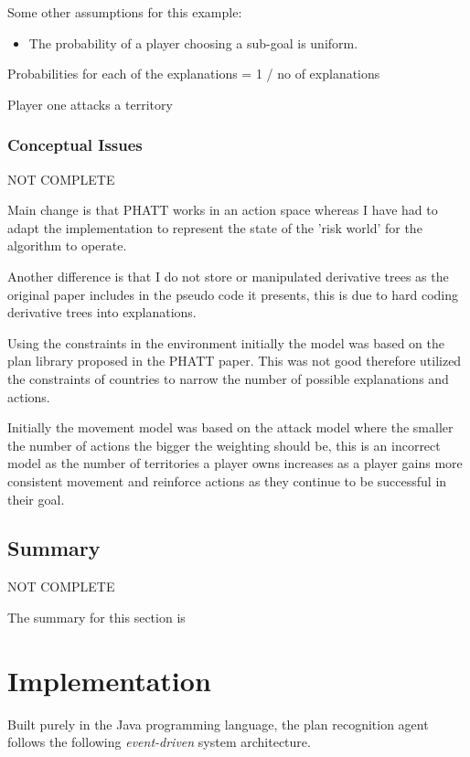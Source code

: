 \documentclass[parskip]{cs4rep}
\begin{document}
Some other assumptions for this example:

\begin{itemize}
\item
The probability of a player choosing a sub-goal is uniform.
\end{itemize}

Probabilities for each of the explanations = 1 / no of explanations

Player one attacks a territory 

\subsection{Conceptual Issues}

NOT COMPLETE

Main change is that PHATT works in an action space whereas I have had to adapt the implementation to represent the state of the 'risk world' for the algorithm to operate.

Another difference is that I do not store or manipulated derivative trees as the original paper includes in the pseudo code it presents, this is due to hard coding derivative trees into explanations.

Using the constraints in the environment initially the model was based on the plan library proposed in the PHATT paper. This was not good therefore utilized the constraints of countries to narrow the number of possible explanations and actions.

Initially the movement model was based on the attack model where the smaller the number of actions the bigger the weighting should be, this is an incorrect model as the number of territories a player owns increases as a player gains more consistent movement and reinforce actions as they continue to be successful in their goal.

\section{Summary}

NOT COMPLETE

The summary for this section is

\chapter{Implementation}

Built purely in the Java programming language, the plan recognition agent follows the following \textit{event-driven} system architecture.
\end{document}
